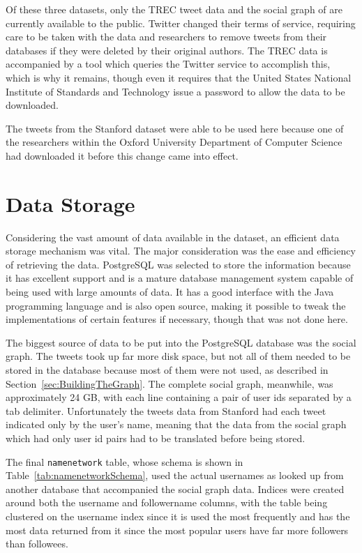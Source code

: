 Of these three datasets, only the TREC tweet data and the social graph of \cite{Kwak2010} are currently available to the public. Twitter changed their terms of service, requiring care to be taken with the data and researchers to remove tweets from their databases if they were deleted by their original authors. The TREC data is accompanied by a tool which queries the Twitter service to accomplish this, which is why it remains, though even it requires that the United States National Institute of Standards and Technology issue a password to allow the data to be downloaded.

The tweets from the Stanford dataset were able to be used here because one of the researchers within the Oxford University Department of Computer Science had downloaded it before this change came into effect.


\section{Data Storage}
\label{sec:DataStorage}

Considering the vast amount of data available in the dataset, an efficient data storage mechanism was vital. The major consideration was the ease and efficiency of retrieving the data. PostgreSQL was selected to store the information because it has excellent support and is a mature database management system capable of being used with large amounts of data. It has a good interface with the Java programming language and is also open source, making it possible to tweak the implementations of certain features if necessary, though that was not done here.

The biggest source of data to be put into the PostgreSQL database was the social graph. The tweets took up far more disk space, but not all of them needed to be stored in the database because most of them were not used, as described in Section~\ref{sec:BuildingTheGraph}. The complete social graph, meanwhile, was approximately 24 GB, with each line containing a pair of user ids separated by a tab delimiter. Unfortunately the tweets data from Stanford had each tweet indicated only by the user's name, meaning that the data from the social graph which had only user id pairs had to be translated before being stored.

The final \texttt{namenetwork} table, whose schema is shown in Table~\ref{tab:namenetworkSchema}, used the actual usernames as looked up from another database that accompanied the social graph data. Indices were created around both the username and followername columns, with the table being clustered on the username index since it is used the most frequently and has the most data returned from it since the most popular users have far more followers than followees.

